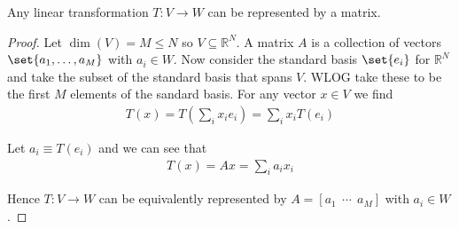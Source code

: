 \documentclass{article}
\begin{document}
\begin{theorem}
  Any linear transformation $T: V \to W$ can be represented by a matrix.
\end{theorem}

\begin{proof}
  Let $\dim(V) = M \le N$ so $V \subseteq \mathbb{R}^N$. A matrix $A$ is a collection of vectors $\set{a_1, \ldots, a_M}$ with $a_i \in W$. Now consider the standard basis $\set{e_i}$ for $\mathbb{R}^N$ and take the subset of the standard basis that spans $V$. WLOG take these to be the first $M$ elements of the sandard basis. For any vector $x \in V$ we find
  \begin{align*}
    T(x)
    =
    T\left(\sum^{}_{i} x_i e_i \right)
    =
    \sum^{}_{i} x_i T\left(e_i \right)
  \end{align*}

  Let $a_i \equiv T(e_i)$ and we can see that
  \begin{align*}
    T(x) = Ax = \sum^{}_{i} a_i x_i
  \end{align*}

  Hence $T: V \to W$ can be equivalently represented by $A = [a_1 ~~ \cdots ~~ a_M]$ with $a_i \in W$.
\end{proof}
\end{document}
